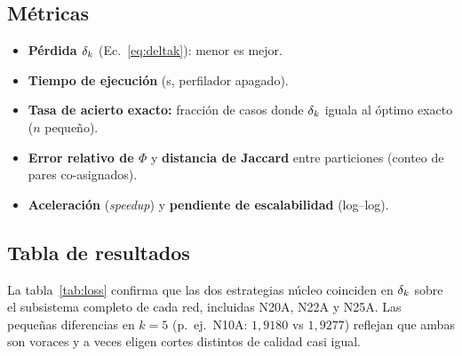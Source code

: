 \documentclass[11pt,letterpaper]{article}
\begin{document}
\subsection{Métricas}
\begin{itemize}
	\item \textbf{Pérdida $\delta_k$} (Ec.~\eqref{eq:deltak}): menor es mejor.
	\item \textbf{Tiempo de ejecución} (s, perfilador apagado).
	\item \textbf{Tasa de acierto exacto:} fracción de casos donde $\delta_k$ iguala al
	      óptimo exacto ($n$ pequeño).
	\item \textbf{Error relativo de $\Phi$} y \textbf{distancia de Jaccard} entre
	      particiones (conteo de pares co-asignados).
	\item \textbf{Aceleración} (\emph{speedup}) y \textbf{pendiente de escalabilidad} (log--log).
\end{itemize}

\subsection{Tabla de resultados}
La tabla~\ref{tab:loss} confirma que las dos estrategias núcleo coinciden en $\delta_k$
sobre el subsistema completo de cada red, incluidas N20A, N22A y N25A. Las pequeñas
diferencias en $k=5$ (p.\ ej.\ N10A: $1{,}9180$ vs $1{,}9277$) reflejan que ambas son
voraces y a veces eligen cortes distintos de calidad casi igual.
\end{document}

